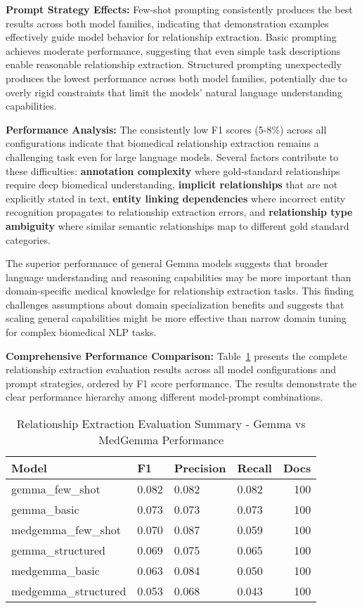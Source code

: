\textbf{Prompt Strategy Effects:} Few-shot prompting consistently produces the best results across both model families, indicating that demonstration examples effectively guide model behavior for relationship extraction. Basic prompting achieves moderate performance, suggesting that even simple task descriptions enable reasonable relationship extraction. Structured prompting unexpectedly produces the lowest performance across both model families, potentially due to overly rigid constraints that limit the models' natural language understanding capabilities.

\textbf{Performance Analysis:} The consistently low F1 scores (5-8\%) across all configurations indicate that biomedical relationship extraction remains a challenging task even for large language models. Several factors contribute to these difficulties: \textbf{annotation complexity} where gold-standard relationships require deep biomedical understanding, \textbf{implicit relationships} that are not explicitly stated in text, \textbf{entity linking dependencies} where incorrect entity recognition propagates to relationship extraction errors, and \textbf{relationship type ambiguity} where similar semantic relationships map to different gold standard categories.

The superior performance of general Gemma models suggests that broader language understanding and reasoning capabilities may be more important than domain-specific medical knowledge for relationship extraction tasks. This finding challenges assumptions about domain specialization benefits and suggests that scaling general capabilities might be more effective than narrow domain tuning for complex biomedical NLP tasks.

\textbf{Comprehensive Performance Comparison:} Table~\ref{tab:relation_extraction_summary} presents the complete relationship extraction evaluation results across all model configurations and prompt strategies, ordered by F1 score performance. The results demonstrate the clear performance hierarchy among different model-prompt combinations.

\begin{table}[htbp]
\centering
\caption{Relationship Extraction Evaluation Summary - Gemma vs MedGemma Performance}
\label{tab:relation_extraction_summary}
\begin{tabular}{llllr}
\toprule
\textbf{Model} & \textbf{F1} & \textbf{Precision} & \textbf{Recall} & \textbf{Docs} \\
\midrule
gemma\_few\_shot & 0.082 & 0.082 & 0.082 & 100 \\
gemma\_basic & 0.073 & 0.073 & 0.073 & 100 \\
medgemma\_few\_shot & 0.070 & 0.087 & 0.059 & 100 \\
gemma\_structured & 0.069 & 0.075 & 0.065 & 100 \\
medgemma\_basic & 0.063 & 0.084 & 0.050 & 100 \\
medgemma\_structured & 0.053 & 0.068 & 0.043 & 100 \\
\bottomrule
\end{tabular}
\end{table}

